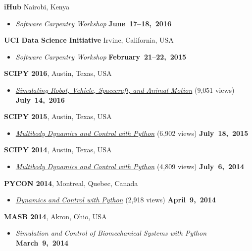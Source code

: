 \documentclass[10pt]{article}
\newenvironment{outerlist}[1][\enskip\textbullet]%
        {\begin{itemize}[#1]}{\end{itemize}%
         \vspace{-.6\baselineskip}}
\newenvironment{innerlist}[1][\enskip\textbullet]%
        {\begin{compactitem}[#1]}{\end{compactitem}}
\newcommand{\blankline}{\quad\pagebreak[2]}
\begin{document}
\begin{innerlist}
\blankline

\textbf{iHub} Nairobi, Kenya
\begin{outerlist}
  \item[] \textit{Software Carpentry Workshop}
    \hfill \textbf{June~17--18,~2016}
\end{outerlist}

\blankline

\textbf{UCI Data Science Initiative} Irvine, California, USA
\begin{outerlist}
  \item[] \textit{ Software Carpentry Workshop}
    \hfill \textbf{February~21--22,~2015}
\end{outerlist}

\blankline

\textbf{SCIPY 2016}, Austin, Texas, USA
\begin{outerlist}
  \item[] \href{https://youtu.be/r4piIKV4sDw}{\textit{Simulating Robot,
    Vehicle, Spacecraft, and Animal Motion}} (9,051 views)
    \hfill \textbf{July~14,~2016}
\end{outerlist}

\blankline

\textbf{SCIPY 2015}, Austin, Texas, USA
\begin{outerlist}
  \item[] \href{https://youtu.be/mdo2NYtA-xY}{\textit{Multibody Dynamics and
    Control with Python}} (6,902 views)
    \hfill \textbf{July~18,~2015}
\end{outerlist}

\blankline

\textbf{SCIPY 2014}, Austin, Texas, USA
\begin{outerlist}
  \item[] \href{https://youtu.be/lWbeuDwYVto}{\textit{Multibody Dynamics and
    Control with Python}} (4,809 views) \hfill \textbf{July~6,~2014}
\end{outerlist}

\blankline

\textbf{PYCON 2014}, Montreal, Quebec, Canada
\begin{outerlist}
  \item[] \href{https://youtu.be/IoMR-ESzqw8}{\textit{Dynamics and Control with
    Python}} (2,918 views)
    \hfill \textbf{April~9,~2014}
\end{outerlist}

\blankline

\textbf{MASB 2014}, Akron, Ohio, USA
\begin{outerlist}
  \item[] \textit{Simulation and Control of Biomechanical Systems with Python}
    \hfill \textbf{March~9,~2014}
\end{outerlist}


\end{innerlist}
\end{document}
